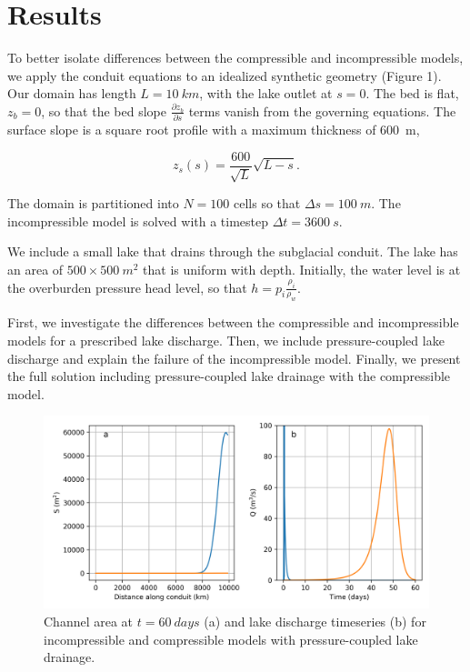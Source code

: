 \documentclass[11pt]{article}
\begin{document}
\section{Results}
To better isolate differences between the compressible and incompressible models, we apply the conduit equations to an idealized synthetic geometry (Figure 1). Our domain has length $L = \SI{10}{km}$, with the lake outlet at $s = 0$. The bed is flat, $z_b = 0$, so that the bed slope $\frac{\partial z_b}{\partial s}$ terms vanish from the governing equations. The surface slope is a square root profile with a maximum thickness of \SI{600}{m},
\begin{linenomath*}
\begin{equation*}
z_s(s) = \frac{600}{\sqrt{L}}\sqrt{L - s}.
\end{equation*}
\end{linenomath*}
The domain is partitioned into $N = 100$ cells so that $\Delta s = \SI{100}{m}$. The incompressible model is solved with a timestep $\Delta t = \SI{3600}{s}$.

We include a small lake that drains through the subglacial conduit. The lake has an area of $500 \times 500\SI{}{m^2}$ that is uniform with depth. Initially, the water level is at the overburden pressure head level, so that $h = p_i\frac{\rho_i}{\rho_w}$.

First, we investigate the differences between the compressible and incompressible models for a prescribed lake discharge. Then, we include pressure-coupled lake discharge and explain the failure of the incompressible model. Finally, we present the full solution including pressure-coupled lake drainage with the compressible model.

\begin{figure}[tp]
\centering
\includegraphics[width=\textwidth]{pressure_discharge_comparison.png}
\caption{Channel area at $t = \SI{60}{days}$ (a) and lake discharge timeseries (b) for incompressible and compressible models with pressure-coupled lake drainage.}
\label{fig:pressure-coupled}
\end{figure}
\end{document}

